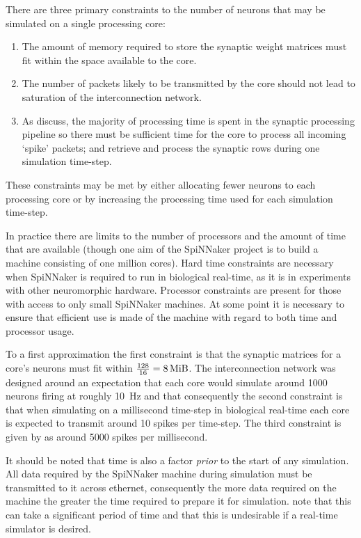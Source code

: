 \documentclass[conference]{IEEEtran}
\begin{document}
  There are three primary constraints to the number of neurons that may be
  simulated on a single processing core:

  \begin{enumerate}
    \item The amount of memory required to store the synaptic weight matrices
      must fit within the space available to the core.
    \item The number of packets likely to be transmitted by the core should not
      lead to saturation of the interconnection network.
    \item As \textcite{Sharp2013} discuss, the majority of processing time is spent in the synaptic processing pipeline so there must be sufficient time for the core to process all incoming `spike' packets; and retrieve and process the synaptic rows during one simulation time-step.
  \end{enumerate}

  These constraints may be met by either allocating fewer neurons to each
  processing core or by increasing the processing time used for each simulation
  time-step.
  
  In practice there are limits to the number of processors and the amount of
  time that are available (though one aim of the SpiNNaker project is to build
  a machine consisting of one million cores). Hard time constraints are
  necessary when SpiNNaker is required to run in biological real-time, as it is
  in experiments with other neuromorphic hardware. Processor constraints are
  present for those with access to only small SpiNNaker machines. At some
  point it is necessary to ensure that efficient use is made of the machine
  with regard to both time and processor usage.

  To a first approximation the first constraint is that the synaptic matrices
  for a core's neurons must fit within $\frac{128}{16} = \SI{8}{\mebi\byte}$.
  The interconnection network was designed around an expectation that each core
  would simulate around \num{1000} neurons firing at roughly \SI{10}{\hertz}
  and that consequently the second constraint is that when simulating on a
  millisecond time-step in biological real-time each core is expected to
  transmit around 10 spikes per time-step. The third constraint is given by
  \textcite[\S III.C]{Sharp2013} as around \num{5000} spikes per millisecond.

  It should be noted that time is also a factor \textit{prior} to the start of
  any simulation. All data required by the SpiNNaker machine during simulation
  must be transmitted to it across ethernet, consequently the more data
  required on the machine the greater the time required to prepare it for
  simulation. \textcite{Sharp2013} note that this can take a significant
  period of time and that this is undesirable if a real-time simulator is
  desired.
\end{document}
